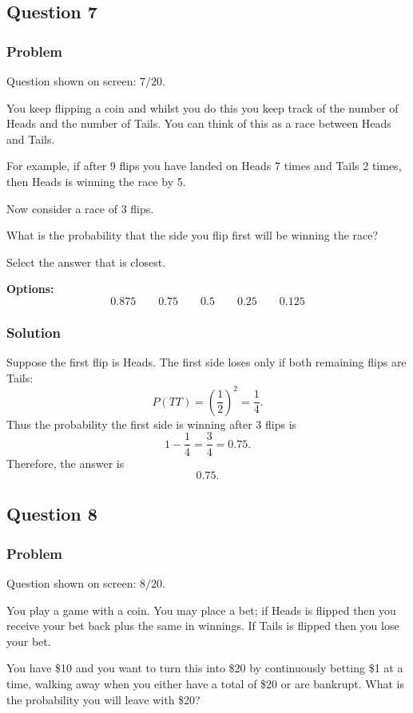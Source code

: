 \documentclass[12pt]{article}
\begin{document}
\subsection{Question 7}
\subsubsection{Problem}
Question shown on screen: \(7/20\).

You keep flipping a coin and whilst you do this you keep track of the number of Heads and the number of Tails. You can think of this as a race between Heads and Tails.

For example, if after 9 flips you have landed on Heads 7 times and Tails 2 times, then Heads is winning the race by 5.

Now consider a race of 3 flips.

What is the probability that the side you flip first will be winning the race?

Select the answer that is closest.

\noindent\textbf{Options:}
\[
\boxed{0.875}
\qquad
\boxed{0.75}
\qquad
\boxed{0.5}
\qquad
\boxed{0.25}
\qquad
\boxed{0.125}
\]

\subsubsection{Solution}
Suppose the first flip is Heads. The first side loses only if both remaining flips are Tails:
\[
P(TT)=\left(\frac{1}{2}\right)^2=\frac{1}{4}.
\]
Thus the probability the first side is winning after 3 flips is
\[
1-\frac{1}{4}=\frac{3}{4}=0.75.
\]
Therefore, the answer is
\[
\boxed{0.75}.
\]

\subsection{Question 8}
\subsubsection{Problem}
Question shown on screen: \(8/20\).

You play a game with a coin. You may place a bet; if Heads is flipped then you receive your bet back plus the same in winnings. If Tails is flipped then you lose your bet.

You have \$10 and you want to turn this into \$20 by continuously betting \$1 at a time, walking away when you either have a total of \$20 or are bankrupt. What is the probability you will leave with \$20?
\end{document}
